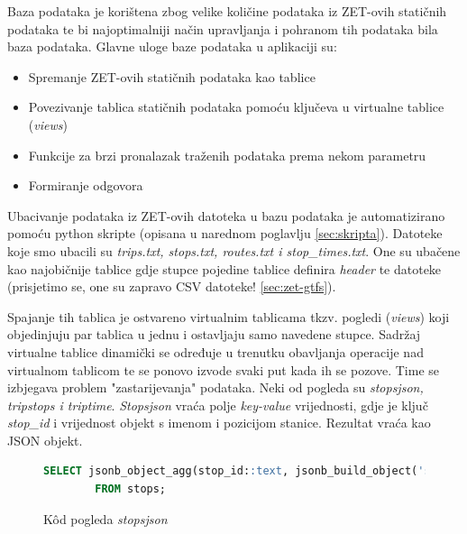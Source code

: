 \documentclass[zavrsnirad]{fer}
\begin{document}
Baza podataka je korištena zbog velike količine podataka iz ZET-ovih statičnih podataka te bi najoptimalniji način upravljanja i pohranom tih podataka bila baza podataka.
Glavne uloge baze podataka u aplikaciji su:
\begin{itemize}
	\item Spremanje ZET-ovih statičnih podataka kao tablice
 	\item Povezivanje tablica statičnih podataka pomoću ključeva u virtualne tablice (\textit{views})
 	\item Funkcije za brzi pronalazak traženih podataka prema nekom parametru
 	\item Formiranje odgovora
\end{itemize}

Ubacivanje podataka iz ZET-ovih datoteka u bazu podataka je automatizirano pomoću python skripte (opisana u narednom poglavlju \ref{sec:skripta}). Datoteke koje smo ubacili su \textit{trips.txt, stops.txt, routes.txt i stop\_times.txt}. One su ubačene kao najobičnije tablice gdje stupce pojedine tablice definira \textit{header} te datoteke (prisjetimo se, one su zapravo CSV datoteke! \ref{sec:zet-gtfs}).

Spajanje tih tablica je ostvareno virtualnim tablicama tkzv. pogledi (\textit{views}) koji objedinjuju par tablica u jednu i ostavljaju samo navedene stupce. Sadržaj virtualne tablice dinamički se određuje u trenutku obavljanja operacije nad virtualnom tablicom te se ponovo izvode svaki put kada ih se pozove. Time se izbjegava problem "zastarijevanja" podataka.
\newpage
Neki od pogleda su \textit{stopsjson, tripstops i triptime}.
\textit{Stopsjson} vraća polje \textit{key-value} vrijednosti, gdje je ključ \textit{stop\_id} i vrijednost objekt s imenom i pozicijom stanice. Rezultat vraća kao JSON objekt.
\begin{figure}[h]
	\centering
	\begin{minipage}{0.8\linewidth}
		\begin{lstlisting}[language=SQL]
 		SELECT jsonb_object_agg(stop_id::text, jsonb_build_object('stop_name', stop_name, 'stop_lat', stop_lat, 'stop_lon', stop_lon)) AS stops
		FROM stops;
		\end{lstlisting}
	\end{minipage}
	\caption{K\^od pogleda \textit{stopsjson}}
	\label{slk:stopsjson}
\end{figure}
\\
\end{document}
